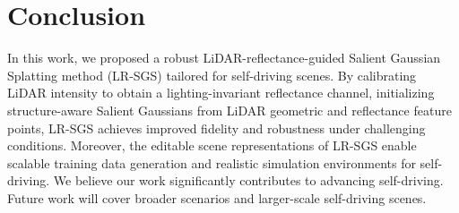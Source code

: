 \documentclass[letterpaper, 10 pt, conference]{ieeeconf}  %
\begin{document}
\section{Conclusion}

In this work, we proposed a robust LiDAR-reflectance-guided Salient Gaussian Splatting method (LR-SGS) tailored for self-driving scenes. By calibrating LiDAR intensity to obtain a lighting-invariant reflectance channel, initializing structure-aware Salient Gaussians from LiDAR geometric and reflectance feature points, LR-SGS achieves improved fidelity and robustness under challenging conditions. Moreover, the editable scene representations of LR-SGS enable scalable training data generation and realistic simulation environments for self-driving. We believe our work significantly contributes to advancing self-driving. Future work will cover broader scenarios and larger-scale self-driving scenes.



 




\end{document}
